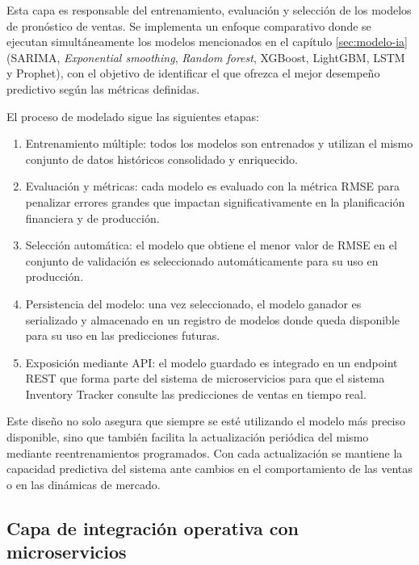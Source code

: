 Esta capa es responsable del entrenamiento, evaluación y selección de los modelos de pronóstico de ventas. Se implementa un enfoque comparativo donde se ejecutan simultáneamente los modelos mencionados en el capítulo \ref{sec:modelo-ia} (SARIMA, \textit{Exponential smoothing}, \textit{Random forest}, XGBoost, LightGBM, LSTM y Prophet), con el objetivo de identificar el que ofrezca el mejor desempeño predictivo según las métricas definidas.

El proceso de modelado sigue las siguientes etapas:

\begin{enumerate}
	\item Entrenamiento múltiple: todos los modelos son entrenados y utilizan el mismo conjunto de datos históricos consolidado y enriquecido.
	\item Evaluación y métricas: cada modelo es evaluado con la métrica RMSE para penalizar errores grandes que impactan significativamente en la planificación financiera y de producción.

	\item Selección automática: el modelo que obtiene el menor valor de RMSE en el conjunto de validación es seleccionado automáticamente para su uso en producción.
	\item Persistencia del modelo: una vez seleccionado, el modelo ganador es serializado y almacenado en un registro de modelos donde queda disponible para su uso en las predicciones futuras.

	\item Exposición mediante API: el modelo guardado es integrado en un endpoint REST \citep{rest_api_stars} que forma parte del sistema de microservicios para que el sistema Inventory Tracker consulte las predicciones de ventas en tiempo real.
\end{enumerate}




Este diseño no solo asegura que siempre se esté utilizando el modelo más preciso disponible, sino que también facilita la actualización periódica del mismo mediante reentrenamientos programados. Con cada actualización se mantiene la capacidad predictiva del sistema ante cambios en el comportamiento de las ventas o en las dinámicas de mercado.




\subsection{Capa de integración operativa con microservicios}


